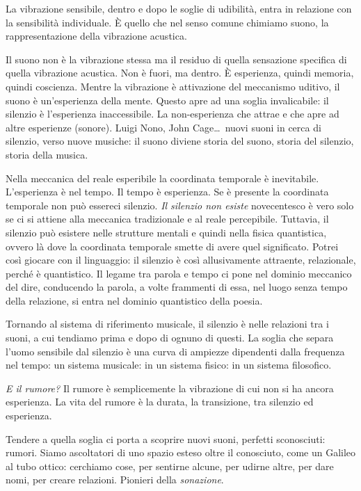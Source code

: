 \documentclass{../../lib/gs}
\begin{document}
La vibrazione sensibile, dentro e dopo le soglie di udibilità, entra in
relazione con la sensibilità individuale. È quello che nel senso comune
chimiamo suono, la rappresentazione della vibrazione acustica.

Il suono non è la vibrazione stessa ma il residuo di quella sensazione specifica
di quella vibrazione acustica. Non è fuori, ma dentro. È esperienza, quindi
memoria, quindi coscienza. Mentre la vibrazione è attivazione del meccanismo
uditivo, il suono è un'esperienza della mente. Questo apre ad una soglia
invalicabile: il silenzio è l'esperienza inaccessibile. La non-esperienza che
attrae e che apre ad altre esperienze (sonore). Luigi Nono, John
Cage\ldots~nuovi suoni in cerca di silenzio, verso nuove musiche: il suono
diviene storia del suono, storia del silenzio, storia della musica.

Nella meccanica del reale esperibile la coordinata temporale è inevitabile.
L'esperienza è nel tempo. Il tempo è esperienza. Se è presente la coordinata
temporale non può essereci silenzio. \emph{Il silenzio non esiste} novecentesco
è vero solo se ci si attiene alla meccanica tradizionale e al reale percepibile.
Tuttavia, il silenzio può esistere nelle strutture mentali e quindi nella fisica
quantistica, ovvero là dove la coordinata temporale smette di avere quel
significato. Potrei così giocare con il linguaggio: il silenzio è così
allusivamente attraente, relazionale, perché è quantistico. Il legame tra parola
e tempo ci pone nel dominio meccanico del dire, conducendo la parola, a volte
frammenti di essa, nel luogo senza tempo della relazione, si entra nel dominio
quantistico della poesia.

Tornando al sistema di riferimento musicale, il silenzio è nelle relazioni tra i
suoni, a cui tendiamo prima e dopo di ognuno di questi. La soglia che separa
l'uomo sensibile dal silenzio è una curva di ampiezze dipendenti dalla frequenza
nel tempo: un sistema musicale: in un sistema fisico: in un sistema filosofico.

\emph{E il rumore?} Il rumore è semplicemente la vibrazione di cui non si ha
ancora esperienza. La vita del rumore è la durata, la transizione, tra silenzio
ed esperienza.

Tendere a quella soglia ci porta a scoprire nuovi suoni, perfetti sconosciuti:
rumori. Siamo ascoltatori di uno spazio esteso oltre il conosciuto, come un
Galileo al tubo ottico: cerchiamo cose, per sentirne alcune, per udirne
altre, per dare nomi, per creare relazioni. Pionieri della \emph{sonazione}.
\end{document}
